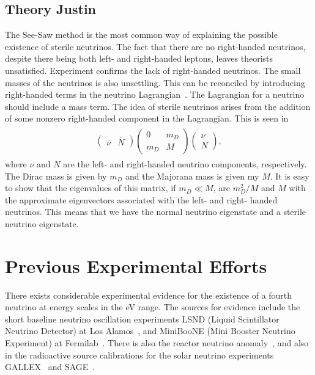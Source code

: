 \documentclass[aps,prd,twocolumn,nofootinbib]{revtex4-1}
\begin{document}
\subsection{Theory Justin}
The See-Saw method is the most common way of explaining the possible existence of sterile neutrinos.  The fact that there are no right-handed neutrinos, despite there being both left- and right-handed leptons, leaves theorists unsatisfied. Experiment confirms the lack of right-handed neutrinos.  The small masses of the neutrinos is also unsettling. This can be reconciled by introducing right-handed terms in the neutrino Lagrangian~\cite{justin1}. The Lagrangian for a neutrino should include a mass term.  The idea of sterile neutrinos arises from the addition of some nonzero right-handed component in the Lagrangian. This is seen in
\begin{align}
  \begin{split}
  \begin{pmatrix}
    \overline{\nu} & \overline{N}
  \end{pmatrix}
  \begin{pmatrix}
    0 & m_D \\ m_D & M
  \end{pmatrix}
  \begin{pmatrix}
    \nu \\ N
  \end{pmatrix},
  \end{split}
\end{align}
where $\nu$ and $N$ are the left- and right-handed neutrino components, respectively. The Dirac mass is given by $m_D$ and the Majorana mass is given my $M$. It is easy to show that the eigenvalues of this matrix, if $m_D \ll M$, are $m_D^2/M$ and $M$ with the approximate eigenvectors associated with the left- and right- handed neutrinos. This means that we have the normal neutrino eigenstate and a sterile neutrino eigenstate.

\section{Previous Experimental Efforts}
There exists considerable experimental evidence for the existence of a fourth neutrino at energy scales in the eV range. The sources for evidence include the short baseline neutrino oscillation experiments LSND (Liquid Scintillator Neutrino Detector) at Los Alamos~\cite{LSND}, and MiniBooNE (Mini Booster Neutrino Experiment) at Fermilab~\cite{mini1,mini2}. There is also the reactor neutrino anomaly~\cite{reactor_anom1}, and also in the radioactive source calibrations for the solar neutrino experiments GALLEX~\cite{gallex1,gallex2} and SAGE~\cite{sage1,sage2}.
\end{document}
